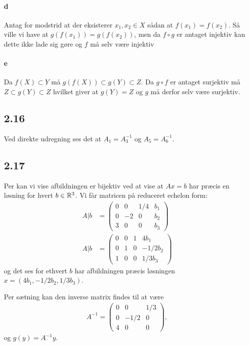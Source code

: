 			\paragraph{d} Antag for modstrid at der eksisterer $x_1,x_2 \in X$ sådan at $f(x_1)=f(x_2)$. Så ville vi have at $g(f(x_1))=g(f(x_2))$, men da $f \circ g$ er antaget injektiv kan dette ikke lade sig gøre og $f$ må selv være injektiv

			\paragraph{e} Da $f(X)\subset Y$ må $g(f(X)) \subset g(Y) \subset Z$. Da $g \circ f$ er antaget surjektiv må $Z \subset g(Y) \subset Z$ hvilket giver at $g(Y)=Z$ og $g$ må derfor selv være surjektiv.

		\subsection{2.16}

			Ved direkte udregning ses det at $A_1=A_3^{-1}$ og $A_5=A_6^{-1}$.

		\subsection{2.17} 

			Per \cite[sætning 2.4.9]{hesselholt2017} kan vi vise afbildningen er bijektiv ved at vise at $Ax=b$ har præcis en løsning for hvert $b\in \mathbb{R}^3$.  Vi får matricen på reduceret echelon form:
				\begin{align*}
					A|b&=\left(\begin{array}{ccc|c}{0} & {0} & {1 / 4} & {b_1} \\ {0} & {-2} & {0} & {b_2} \\ {3} & {0} & {0} & {b_3} \end{array}\right) \\
					A|b&=\left(\begin{array}{ccc|c}{0} & {0} & {1} & {4b_1} \\ {0} & {1} & {0} & {-1/2b_2} \\ {1} & {0} & {0} & {1/3b_3} \end{array}\right) 
				\end{align*} 
			og det ses for ethvert $b$ har afbildningen præcis løsningen $x=(4b_1,-1/2b_2,1/3b_3)$.

			Per sætning \cite[2.4.12]{hesselholt2017} kan den inverse matrix findes til at være 
				\begin{align*}
					A^{-1}=\left(\begin{array}{ccc}{0} & {0} & {1/3} \\ {0} & {-1/2} & {0} \\ {4} & {0} & {0} \end{array}\right),
				\end{align*} 
			og $g(y)=A^{-1}y$.

